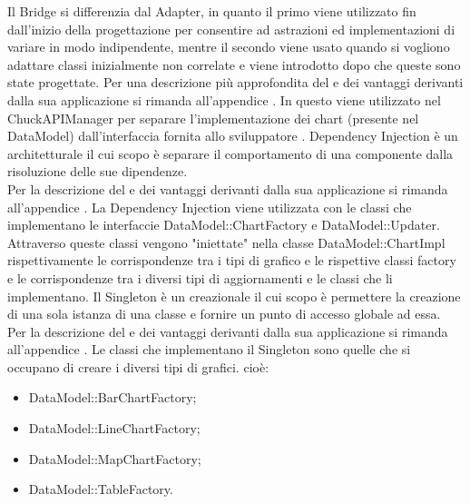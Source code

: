 			Il  Bridge si differenzia dal  Adapter, in quanto il primo viene utilizzato fin dall'inizio della progettazione per consentire ad astrazioni ed implementazioni di variare in modo indipendente, mentre il secondo viene usato quando si vogliono adattare classi inizialmente non correlate e viene introdotto dopo che queste sono state progettate.
			Per una descrizione più approfondita del  e dei vantaggi derivanti dalla sua applicazione si rimanda all'appendice .
				In  questo  viene utilizzato nel  ChuckAPIManager per separare l'implementazione dei chart (presente nel  DataModel) dall'interfaccia fornita allo sviluppatore .
			Dependency Injection è un  architetturale il cui scopo è separare il comportamento di una componente dalla risoluzione delle sue dipendenze.\\
			Per la descrizione del  e dei vantaggi derivanti dalla sua applicazione si rimanda all'appendice .
				La Dependency Injection viene utilizzata con le classi che implementano le interfaccie DataModel::ChartFactory e DataModel::Updater. Attraverso queste classi vengono "iniettate" nella classe DataModel::ChartImpl rispettivamente le corrispondenze tra i tipi di grafico e le rispettive classi factory e le corrispondenze tra i diversi tipi di aggiornamenti e le classi che li implementano.
			Il Singleton è un  creazionale il cui scopo è permettere la creazione di una sola istanza di una classe e fornire un punto di accesso globale ad essa.\\
			Per la descrizione del  e dei vantaggi derivanti dalla sua applicazione si rimanda all'appendice .
				Le classi che implementano il Singleton sono quelle che si occupano di creare i diversi tipi di grafici. cioè:
				\begin{itemize}
					\item DataModel::BarChartFactory;
					\item DataModel::LineChartFactory;
					\item DataModel::MapChartFactory;
					\item DataModel::TableFactory.
			\end{itemize}
